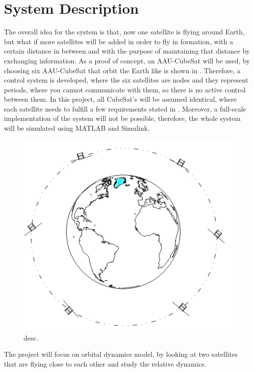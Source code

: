 \chapter{System Description}\label{chap:systemDescribtion}
The overall idea for the system is that, now one satellite is flying around Earth, but what if more satellites will be added in order to fly in formation, with a certain distance in between and with the purpose of maintaining that distance by exchanging information. As a proof of concept, an AAU-CubeSat will be used, by choosing six AAU-CubeSat that orbit the Earth like is shown in  . Therefore, a control system is developed, where the six satellites are nodes and they represent periods, where you cannot communicate with them, so there is no active control between them. In this project, all CubeSat's will be assumed identical, where each satellite needs to fulfill a few requirements stated in . Moreover, a full-scale implementation of the system will not be possible, therefore, the whole system will be simulated using MATLAB and Simulink. 
%
\begin{figure}[H]
	\centering
	\includegraphics[width=0.6\linewidth]{figures/earth}
	\caption{desc.}
	\label{fig:1}
\end{figure}
%
The project will focus on orbital dynamics model, by looking at two satellites that are flying close to each other and study the relative dynamics.
%
